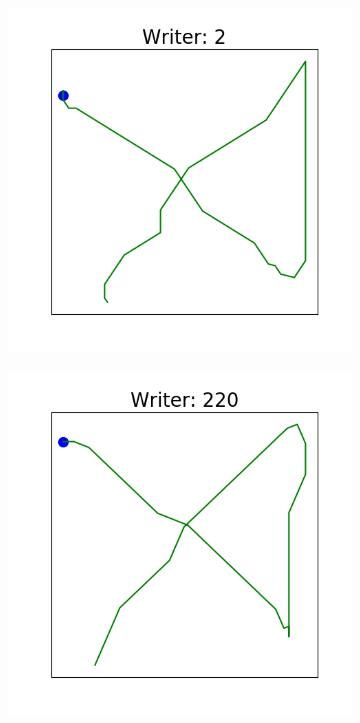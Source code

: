 \begin{figure}[!htbp]
\begin{subfigure}{0.45\textwidth}
      \end{subfigure}
      \vspace{1em}
      \begin{subfigure}{0.45\textwidth}
          \includegraphics[scale=0.50]{images/framework/X_2.png}
      \end{subfigure}
      \hspace{0.5em}
      \begin{subfigure}{0.45\textwidth}
          \includegraphics[scale=0.50]{images/framework/X_220.png}
      \end{subfigure}


\end{figure}
